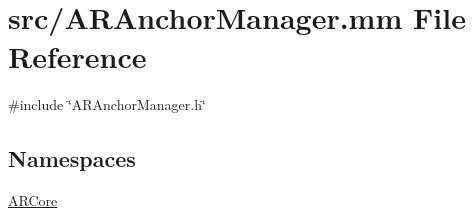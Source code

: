\hypertarget{_a_r_anchor_manager_8mm}{}\section{src/\+A\+R\+Anchor\+Manager.mm File Reference}
\label{_a_r_anchor_manager_8mm}
{\ttfamily \#include \char`\"{}A\+R\+Anchor\+Manager.\+h\char`\"{}}\newline
\subsection*{Namespaces}
\begin{DoxyCompactItemize}
\item 
 \hyperlink{namespace_a_r_core}{A\+R\+Core}
\end{DoxyCompactItemize}

